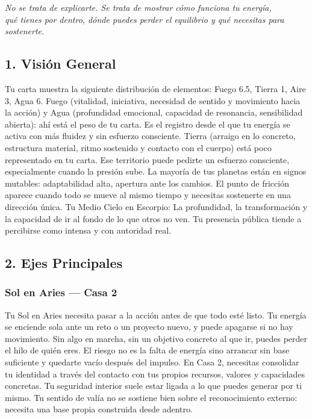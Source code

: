 \documentclass[11pt,a4paper]{article}
\begin{document}
\begin{center}
{\small\itshape
No se trata de explicarte. Se trata de mostrar cómo funciona tu energía,\\
qué tienes por dentro, dónde puedes perder el equilibrio y qué necesitas para sostenerte.
}
\end{center}

\vspace{0.5cm}

\subsection{1. Visión General}

Tu carta muestra la siguiente distribución de elementos: Fuego 6.5, Tierra 1, Aire 3, Agua 6. Fuego (vitalidad, iniciativa, necesidad de sentido y movimiento hacia la acción) y Agua (profundidad emocional, capacidad de resonancia, sensibilidad abierta): ahí está el peso de tu carta. Es el registro desde el que tu energía se activa con más fluidez y sin esfuerzo consciente. Tierra (arraigo en lo concreto, estructura material, ritmo sostenido y contacto con el cuerpo) está poco representado en tu carta. Ese territorio puede pedirte un esfuerzo consciente, especialmente cuando la presión sube. La mayoría de tus planetas están en signos mutables: adaptabilidad alta, apertura ante los cambios. El punto de fricción aparece cuando todo se mueve al mismo tiempo y necesitas sostenerte en una dirección única. Tu Medio Cielo en Escorpio: La profundidad, la transformación y la capacidad de ir al fondo de lo que otros no ven. Tu presencia pública tiende a percibirse como intensa y con autoridad real.

\subsection{2. Ejes Principales}

\subsubsection*{Sol en Aries — Casa 2}
Tu Sol en Aries necesita pasar a la acción antes de que todo esté listo. Tu energía se enciende sola ante un reto o un proyecto nuevo, y puede apagarse si no hay movimiento. Sin algo en marcha, sin un objetivo concreto al que ir, puedes perder el hilo de quién eres. El riesgo no es la falta de energía sino arrancar sin base suficiente y quedarte vacío después del impulso. En Casa 2, necesitas consolidar tu identidad a través del contacto con tus propios recursos, valores y capacidades concretas. Tu seguridad interior suele estar ligada a lo que puedes generar por ti mismo. Tu sentido de valía no se sostiene bien sobre el reconocimiento externo: necesita una base propia construida desde adentro.
\end{document}
